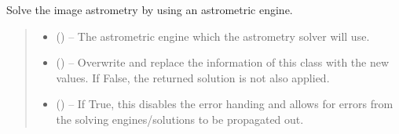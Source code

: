 \documentclass[letterpaper,11pt,english]{sphinxmanual}
\begin{document}
\begin{savenotes}
\begin{fulllineitems}
\begin{savenotes}\begin{fulllineitems}
\label{\detokenize{code/opihiexarata.opihi.solution:opihiexarata.opihi.solution.OpihiSolution.solve_astrometry}}
\pysigstartsignatures
{}
\pysigstopsignatures
\sphinxAtStartPar
Solve the image astrometry by using an astrometric engine.
\begin{quote}\begin{description}
\begin{itemize}
\item {} 
\sphinxAtStartPar
{} ({\hyperref[\detokenize{code/opihiexarata.library.engine:opihiexarata.library.engine.AstrometryEngine}]{}}) – The astrometric engine which the astrometry solver will use.

\item {} 
\sphinxAtStartPar
{} (\sphinxstyleliteralemphasis{\sphinxupquote{, }}) – Overwrite and replace the information of this class with the new
values. If False, the returned solution is not also applied.

\item {} 
\sphinxAtStartPar
{} (\sphinxstyleliteralemphasis{\sphinxupquote{, }}) – If True, this disables the error handing and allows for errors from
the solving engines/solutions to be propagated out.


\end{itemize}
\end{description}
\end{quote}
\end{fulllineitems}
\end{savenotes}
\end{fulllineitems}
\end{savenotes}
\end{document}
